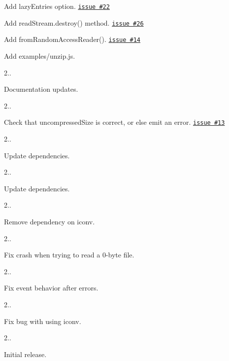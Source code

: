 \begin{DoxyItemize}
\begin{DoxyItemize}
\item Add {\ttfamily lazy\+Entries} option. \href{https://github.com/thejoshwolfe/yauzl/issues/22}{\tt issue \#22}
\item Add {\ttfamily read\+Stream.\+destroy()} method. \href{https://github.com/thejoshwolfe/yauzl/issues/26}{\tt issue \#26}
\item Add {\ttfamily from\+Random\+Access\+Reader()}. \href{https://github.com/thejoshwolfe/yauzl/issues/14}{\tt issue \#14}
\item Add {\ttfamily examples/unzip.\+js}.
\end{DoxyItemize}
\item 2..
\begin{DoxyItemize}
\item Documentation updates.
\end{DoxyItemize}
\item 2..
\begin{DoxyItemize}
\item Check that {\ttfamily uncompressed\+Size} is correct, or else emit an error. \href{https://github.com/thejoshwolfe/yauzl/issues/13}{\tt issue \#13}
\end{DoxyItemize}
\item 2..
\begin{DoxyItemize}
\item Update dependencies.
\end{DoxyItemize}
\item 2..
\begin{DoxyItemize}
\item Update dependencies.
\end{DoxyItemize}
\item 2..
\begin{DoxyItemize}
\item Remove dependency on {\ttfamily iconv}.
\end{DoxyItemize}
\item 2..
\begin{DoxyItemize}
\item Fix crash when trying to read a 0-\/byte file.
\end{DoxyItemize}
\item 2..
\begin{DoxyItemize}
\item Fix event behavior after errors.
\end{DoxyItemize}
\item 2..
\begin{DoxyItemize}
\item Fix bug with using {\ttfamily iconv}.
\end{DoxyItemize}
\item 2..
\begin{DoxyItemize}
\item Initial release. 
\end{DoxyItemize}
\end{DoxyItemize}